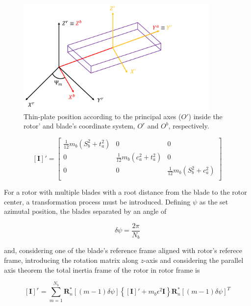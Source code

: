 \begin{figure}[!htb]
    \centering
    \includegraphics[width=10cm]{Figures/background/inertia/inertia_scheme.png}
    \caption{Thin-plate position according to the principal axes ($O'$) inside the rotor' and blade's coordinate system, $O^r$ and $O^b$, respectively.}
    \label{fig:Inertia}
\end{figure}

\begin{equation}
    \left[\mathbf{I}\right]' = 
    \begin{bmatrix}
        \frac{1}{12}m_b(S_b^2+t_a^2) & 0 & 0\\
        0 & \frac{1}{12}m_b(c_a^2+t_a^2) & 0\\
        0 & 0 & \frac{1}{12}m_b(S_b^2+c_a^2)\\
    \end{bmatrix}
    \label{eq:inertia_tensor_principalaxes}
\end{equation}

For a rotor with multiple blades with a root distance from the blade to the rotor center, a transformation process must be introduced. Defining $\psi$ as the set azimutal position, the blades separated by an angle of

\begin{equation}
    \delta\psi = \frac{2\pi}{N_b}
\end{equation}

and, considering one of the blade's reference frame aligned with rotor's referece frame, introducing the rotation matrix along $z$-axis and considering the parallel axis theorem the total inertia frame of the rotor in rotor frame is

\begin{equation}
    \left[\mathbf{I}\right]^r = \sum_{m=1}^{N_b} \boldsymbol{R}_n^*\left[(m-1)\delta\psi\right] \left\{ \left[\mathbf{I}\right]' + m_b \epsilon^2 \boldsymbol{I} \right\} \boldsymbol{R}_n^*\left[(m-1)\delta\psi\right]^T
\end{equation}




